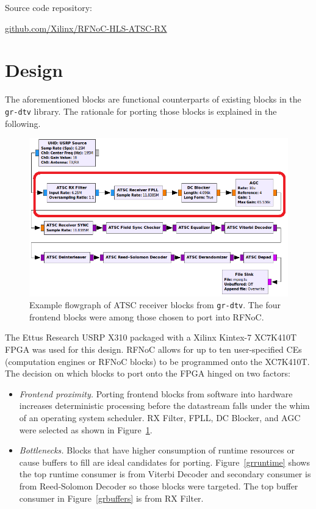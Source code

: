 \documentclass{article}
\begin{document}
Source code repository:
\begin{center}
\url{github.com/Xilinx/RFNoC-HLS-ATSC-RX}
\end{center}

\section{Design} \label{design}
The aforementioned blocks are functional counterparts of existing blocks in the {\tt gr-dtv} library. The rationale for porting those blocks is explained in the following.

\begin{figure}[h]
  \begin{center}
    \centerline{\includegraphics[width=\columnwidth]{gr_frontend.png}}
    \caption{Example flowgraph of ATSC receiver blocks from {\tt gr-dtv}. The four frontend blocks were among those chosen to port into RFNoC.}
    \label{uhd_atsc_rx}
  \end{center}
\end{figure}

The Ettus Research USRP X310 packaged with a Xilinx Kintex-7 XC7K410T FPGA was used for this design. RFNoC allows for up to ten user-specified CEs (computation engines or RFNoC blocks) to be programmed onto the XC7K410T. The decision on which blocks to port onto the FPGA hinged on two factors:

\begin{itemize}
\item[]  
{\em Frontend proximity.} Porting frontend blocks from software into hardware increases deterministic processing before the datastream falls under the whim of an operating system scheduler. RX Filter, FPLL, DC Blocker, and AGC were selected as shown in Figure~\ref{uhd_atsc_rx}.

\item[] 
{\em Bottlenecks.} Blocks that have higher consumption of runtime resources or cause buffers to fill are ideal candidates for porting. Figure~\ref{grruntime} shows the top runtime consumer is from Viterbi Decoder and secondary consumer is from Reed-Solomon Decoder so those blocks were targeted. The top buffer consumer in Figure~\ref{grbuffers} is from RX Filter.
\end{itemize}
\end{document}
